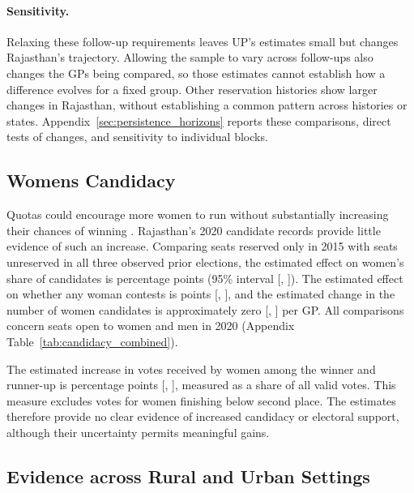 \documentclass[11pt]{article}
\begin{document}
\paragraph{Sensitivity.}
Relaxing these follow-up requirements leaves UP's estimates small but changes Rajasthan's trajectory. Allowing the sample to vary across follow-ups also changes the GPs being compared, so those estimates cannot establish how a difference evolves for a fixed group. Other reservation histories show larger changes in Rajasthan, without establishing a common pattern across histories or states. Appendix~\ref{sec:persistence_horizons} reports these comparisons, direct tests of changes, and sensitivity to individual blocks.

\FloatBarrier
\subsection{Women\textquotesingle{}s Candidacy}\label{sec:candidacy_results}

Quotas could encourage more women to run without substantially increasing their chances of winning \citep{o2020can, auerbach2016electoral}. Rajasthan's 2020 candidate records provide little evidence of such an increase. Comparing seats reserved only in 2015 with seats unreserved in all three observed prior elections, the estimated effect on women's share of candidates is \candShare{} percentage points (95\% interval [\candShareLow{}, \candShareHigh{}]). The estimated effect on whether any woman contests is \candAny{} points [\candAnyLow{}, \candAnyHigh{}], and the estimated change in the number of women candidates is approximately zero [\candCountLow{}, \candCountHigh{}] per GP. All comparisons concern seats open to women and men in 2020 (Appendix Table~\ref{tab:candidacy_combined}).

The estimated increase in votes received by women among the winner and runner-up is \candVotes{} percentage points [\candVotesLow{}, \candVotesHigh{}], measured as a share of all valid votes. This measure excludes votes for women finishing below second place. The estimates therefore provide no clear evidence of increased candidacy or electoral support, although their uncertainty permits meaningful gains.

\subsection{Evidence across Rural and Urban Settings}\label{sec:cross_setting_results}
\end{document}
